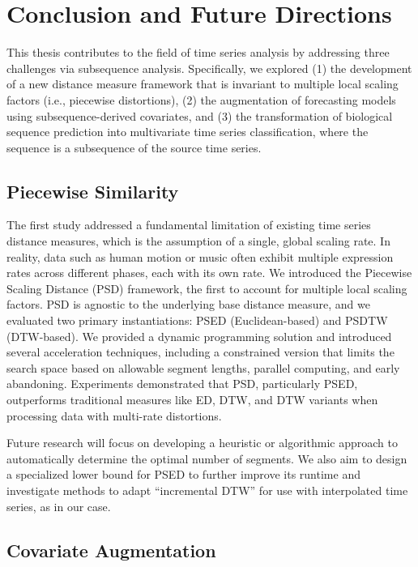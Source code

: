 \chapter{Conclusion and Future Directions} \label{ch:conclusion}

This thesis contributes to the field of time series analysis by addressing three challenges via subsequence analysis. 
Specifically, we explored 
(1) the development of a new distance measure framework that is invariant to multiple local scaling factors (i.e., piecewise distortions), 
(2) the augmentation of forecasting models using subsequence-derived covariates, 
and (3) the transformation of biological sequence prediction into multivariate time series classification, where the sequence is a subsequence of the source time series.

\section{Piecewise Similarity} %

The first study addressed a fundamental limitation of existing time series distance measures, which is the assumption of a single, global scaling rate. 
In reality, data such as human motion or music often exhibit multiple expression rates across different phases, each with its own rate. 
We introduced the Piecewise Scaling Distance (PSD) framework, the first to account for multiple local scaling factors.
%
PSD is agnostic to the underlying base distance measure, and we evaluated two primary instantiations: PSED (Euclidean-based) and PSDTW (DTW-based). 
We provided a dynamic programming solution and introduced several acceleration techniques, including a constrained version that limits the search space based on allowable segment lengths, parallel computing, and early abandoning. Experiments demonstrated that PSD, particularly PSED, outperforms traditional measures like ED, DTW, and DTW variants when processing data with multi-rate distortions.

Future research will focus on developing a heuristic or algorithmic approach to automatically determine the optimal number of segments. 
We also aim to design a specialized lower bound for PSED to further improve its runtime and investigate methods to adapt ``incremental DTW'' for use with interpolated time series, as in our case.

\section{Covariate Augmentation} %

